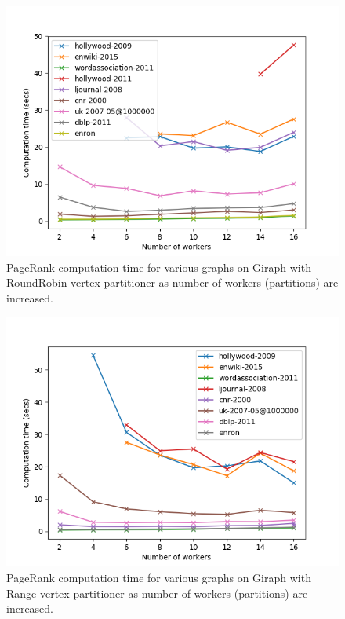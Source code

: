 \begin{figure}
	\centering
	\includegraphics[width=\columnwidth]{./giraph_roundrobin.png}
    \caption{PageRank computation time for various graphs on Giraph with RoundRobin vertex partitioner
        as number of workers (partitions) are increased.}
	\label{fig:giraph_roundrobin}
\end{figure}

\begin{figure}
	\centering
	\includegraphics[width=\columnwidth]{./giraph_range.png}
    \caption{PageRank computation time for various graphs on Giraph with Range vertex partitioner
    as number of workers (partitions) are increased.}
	\label{fig:giraph_range}
\end{figure}

